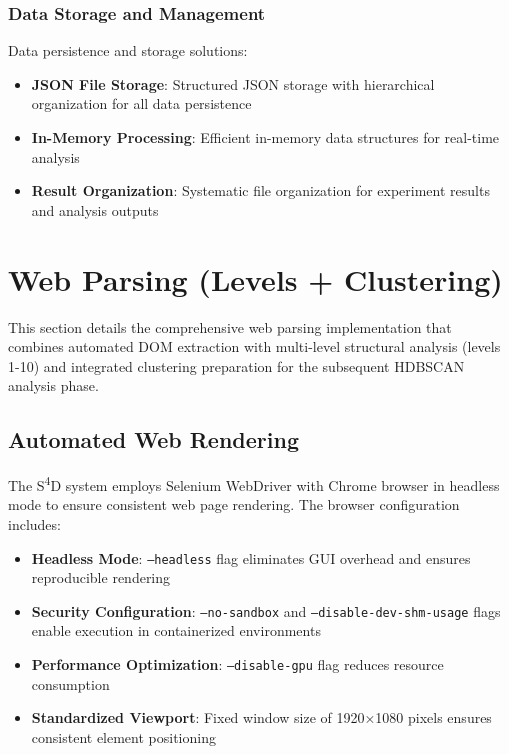 \subsubsection{Data Storage and Management}
Data persistence and storage solutions:
\begin{itemize}
    \item \textbf{JSON File Storage}: Structured JSON storage with hierarchical organization for all data persistence
    \item \textbf{In-Memory Processing}: Efficient in-memory data structures for real-time analysis
    \item \textbf{Result Organization}: Systematic file organization for experiment results and analysis outputs
\end{itemize}

\section{Web Parsing (Levels + Clustering)}
\label{sec:web-parsing}

This section details the comprehensive web parsing implementation that combines automated DOM extraction with multi-level structural analysis (levels 1-10) and integrated clustering preparation for the subsequent HDBSCAN analysis phase.

\subsection{Automated Web Rendering}
\label{subsec:web-rendering}

The S\textsuperscript{4}D system employs Selenium WebDriver with Chrome browser in headless mode to ensure consistent web page rendering. The browser configuration includes:

\begin{itemize}
    \item \textbf{Headless Mode}: \texttt{--headless} flag eliminates GUI overhead and ensures reproducible rendering
    \item \textbf{Security Configuration}: \texttt{--no-sandbox} and \texttt{--disable-dev-shm-usage} flags enable execution in containerized environments
    \item \textbf{Performance Optimization}: \texttt{--disable-gpu} flag reduces resource consumption
    \item \textbf{Standardized Viewport}: Fixed window size of 1920×1080 pixels ensures consistent element positioning
\end{itemize}

